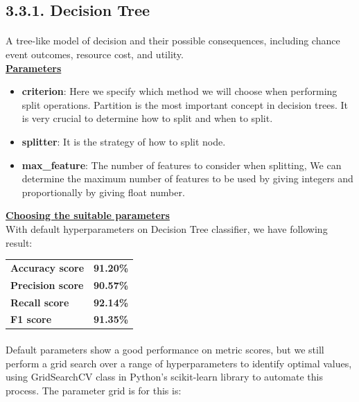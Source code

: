 \documentclass[a4paper]{report}
\begin{document}
	\subsection*{3.3.1. Decision Tree} \Large
	\paragraph{}
	A tree-like model of decision and their possible consequences, including chance event outcomes, resource cost, and utility. \\
	
	\underline{\textbf{\Large Parameters}}
	\begin{itemize} 
		\item \textbf{criterion}: Here we specify which method we will choose when performing split operations. Partition is the most important concept in decision trees. It is very crucial to determine how to split and when to split.
		\item \textbf{splitter}: It is the strategy of how to split node.
		\item \textbf{max\_feature}: The number of features to consider when splitting, We can determine the maximum number of features to be used by giving integers and proportionally by giving float number.
	\end{itemize}
	
	\underline{\textbf{\Large Choosing the suitable parameters}}\\[0.5cm]
	With default hyperparameters on Decision Tree classifier, we have following result:
	
	\begin{center}
		\begin{tabular}{ll}
			\toprule
			\textbf{Accuracy score} & \textbf{91.20\%} \\
			\textbf{Precision score}  & \textbf{90.57\%} \\
			\textbf{Recall score}     & \textbf{92.14\%} \\
			\textbf{F1 score}   & \textbf{91.35\%} \\
			\bottomrule
		\end{tabular}
	\end{center}
	
	\paragraph{}
	Default parameters show a good performance on metric scores, but we still perform a grid search over a range of hyperparameters to identify optimal values, using GridSearchCV class in Python's scikit-learn library to automate this process. The parameter grid is for this is: \\
	
\end{document}
